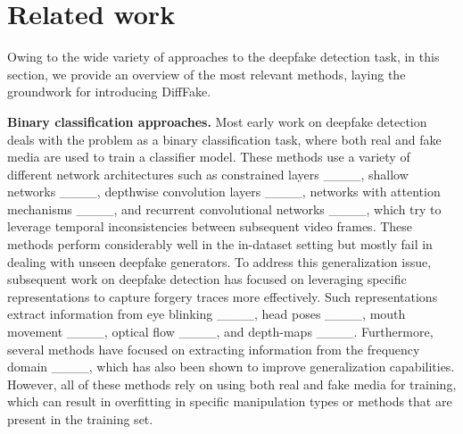 \section{Related work}
Owing to the wide variety of approaches to the deepfake detection task, in this section, we provide an overview of the most relevant methods, laying the groundwork for introducing DiffFake. 



\noindent\textbf{Binary classification approaches.} Most early work on deepfake detection deals with the problem as a binary classification task, where both real and fake media are used to train a classifier model. These methods use a variety of different network architectures such as constrained layers ____, shallow networks ____, depthwise convolution layers ____, networks with attention mechanisms ____, and recurrent convolutional networks ____, which try to leverage temporal inconsistencies between subsequent video frames. These methods perform considerably well in the in-dataset setting but mostly fail in dealing with unseen deepfake generators. To address this generalization issue, subsequent work on deepfake detection has focused on leveraging specific representations to capture forgery traces more effectively. Such representations extract information from eye blinking ____, head poses ____, mouth movement ____, optical flow ____, and depth-maps ____. Furthermore, several methods have focused on extracting information from the frequency domain ____, which has also been shown to improve generalization capabilities. However, all of these methods rely on using both real and fake media for training, which can result in overfitting in specific manipulation types or methods that are present in the training set.

